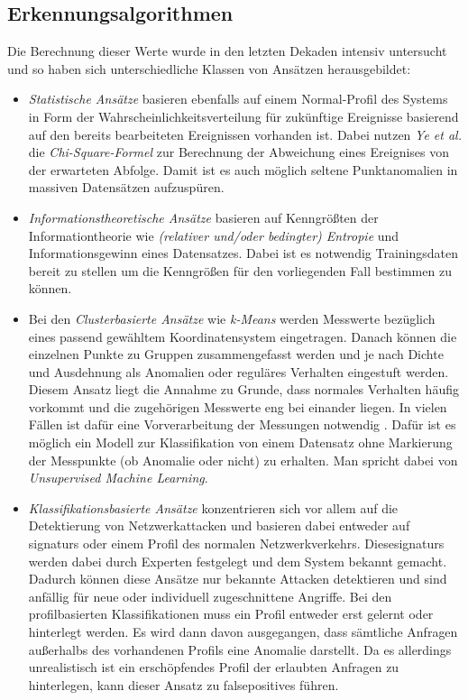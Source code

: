 \subsection{Erkennungsalgorithmen}
Die Berechnung dieser Werte wurde in den letzten Dekaden intensiv untersucht und so haben sich unterschiedliche Klassen von Ansätzen herausgebildet\cite{ahmed2016survey}:
\begin{itemize}
\item \textit{Statistische Ansätze} basieren ebenfalls auf einem Normal-Profil des Systems in Form der Wahrscheinlichkeitsverteilung für zukünftige Ereignisse basierend auf den bereits bearbeiteten  Ereignissen vorhanden ist. Dabei nutzen \textit{Ye et al.} \cite{ye2001anomaly} die \textit{Chi-Square-Formel} zur Berechnung der Abweichung eines Ereignises von der erwarteten Abfolge. Damit ist es auch möglich seltene Punktanomalien in massiven Datensätzen aufzuspüren.
\item \textit{Informationstheoretische Ansätze} basieren auf Kenngrößten der Informationtheorie wie \textit{(relativer und/oder bedingter) Entropie} und Informationsgewinn eines Datensatzes. Dabei ist es notwendig Trainingsdaten bereit zu stellen um die Kenngrößen für den vorliegenden Fall bestimmen zu können. \cite{noble2003graph}
\item Bei den \textit{Clusterbasierte Ansätze} wie \textit{k-Means}\cite{likas2003global} werden Messwerte bezüglich eines passend gewähltem Koordinatensystem eingetragen. Danach können die einzelnen Punkte zu Gruppen zusammengefasst werden und je nach Dichte und Ausdehnung als Anomalien oder reguläres Verhalten eingestuft werden. Diesem Ansatz liegt die Annahme zu Grunde, dass normales Verhalten häufig vorkommt und die zugehörigen Messwerte eng bei einander liegen. In vielen Fällen ist dafür eine Vorverarbeitung der Messungen notwendig \cite{munz2007traffic}. Dafür ist es möglich ein Modell zur Klassifikation von einem Datensatz ohne Markierung der Messpunkte (ob Anomalie oder nicht) zu erhalten. Man spricht dabei von \textit{Unsupervised Machine Learning}\cite{munz2007traffic}.
\item \textit{Klassifikationsbasierte Ansätze} konzentrieren sich vor allem auf die Detektierung von Netzwerkattacken und basieren dabei entweder auf \Glspl{signatur} oder einem Profil des normalen Netzwerkverkehrs. Diese\Glspl{signatur} werden dabei durch Experten festgelegt und dem System bekannt gemacht. Dadurch können diese Ansätze nur bekannte Attacken detektieren und sind anfällig für neue oder individuell zugeschnittene Angriffe. Bei den profilbasierten Klassifikationen muss ein Profil entweder erst gelernt oder hinterlegt werden. Es wird dann davon ausgegangen, dass sämtliche Anfragen außerhalbs des vorhandenen Profils eine Anomalie darstellt. Da es allerdings unrealistisch ist ein erschöpfendes Profil der erlaubten Anfragen zu hinterlegen, kann dieser Ansatz zu \Glspl{falsepositive} führen. 
\end{itemize}
